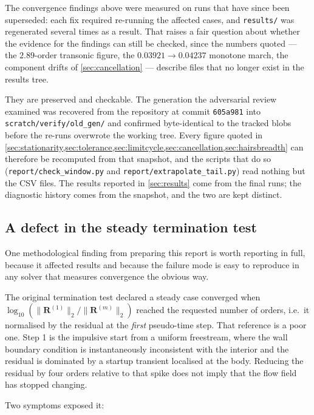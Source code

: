 The convergence findings above were measured on runs that have since been superseded:
each fix required re-running the affected cases, and \texttt{results/} was regenerated
several times as a result. That raises a fair question about whether the evidence for the
findings can still be checked, since the numbers quoted --- the $2.89$-order transonic
figure, the $\num{0.03921}\to\num{0.04237}$ monotone march, the component drifts of
\cref{sec:cancellation} --- describe files that no longer exist in the results tree.

They are preserved and checkable. The generation the adversarial review examined was
recovered from the repository at commit \texttt{605a981} into
\texttt{scratch/verify/old\_gen/} and confirmed byte-identical to the tracked blobs
before the re-runs overwrote the working tree. Every figure quoted in
\cref{sec:stationarity,sec:tolerance,sec:limitcycle,sec:cancellation,sec:hairsbreadth}
can therefore be recomputed from that snapshot, and the scripts that do so
(\texttt{report/check\_window.py} and \texttt{report/extrapolate\_tail.py}) read nothing
but the CSV files. The results reported in \cref{sec:results} come from the final runs;
the diagnostic history comes from the snapshot, and the two are kept distinct.

\subsection{A defect in the steady termination test}
\label{sec:stationarity}

One methodological finding from preparing this report is worth reporting in full,
because it affected results and because the failure mode is easy to reproduce in
any solver that measures convergence the obvious way.

The original termination test declared a steady case converged when
$\log_{10}\left(\|\mathbf{R}^{(1)}\|_2/\|\mathbf{R}^{(m)}\|_2\right)$ reached the
requested number of orders, i.e.\ it normalised by the residual at the
\emph{first} pseudo-time step. That reference is a poor one. Step 1 is the
impulsive start from a uniform freestream, where the wall boundary condition is
instantaneously inconsistent with the interior and the residual is dominated by a
startup transient localised at the body. Reducing the residual by four orders
relative to that spike does not imply that the flow field has stopped changing.

Two symptoms exposed it:

